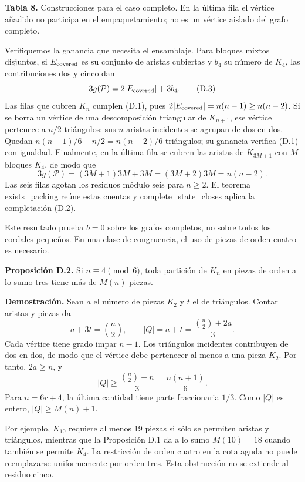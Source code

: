 \documentclass[spanish,11pt,a4paper]{article}
\begin{document}
\textbf{Tabla 8.} Construcciones para el caso completo. En la última fila el vértice añadido no participa en el empaquetamiento; no es un vértice aislado del grafo completo.

Verifiquemos la ganancia que necesita el ensamblaje. Para bloques mixtos disjuntos, si \(E_{\rm covered}\) es su conjunto de aristas cubiertas y \(b_4\) su número de \(K_4\), las contribuciones dos y cinco dan \[
3g(\mathcal P)=2|E_{\rm covered}|+3b_4.
\tag{D.3}
\] Las filas que cubren \(K_n\) cumplen (D.1), pues \(2|E_{\rm covered}|=n(n-1)\ge n(n-2)\). Si se borra un vértice de una descomposición triangular de \(K_{n+1}\), ese vértice pertenece a \(n/2\) triángulos: sus \(n\) aristas incidentes se agrupan de dos en dos. Quedan \(n(n+1)/6-n/2=n(n-2)/6\) triángulos; su ganancia verifica (D.1) con igualdad. Finalmente, en la última fila se cubren las aristas de \(K_{3M+1}\) con \(M\) bloques \(K_4\), de modo que \[
3g(\mathcal P)=(3M+1)3M+3M=(3M+2)3M=n(n-2).
\tag{D.4}
\] Las seis filas agotan los residuos módulo seis para \(n\ge2\). El teorema {\ttfamily\small exists\_\discretionary{\hbox{\ensuremath{\hookrightarrow}}}{}{}packing} reúne estas cuentas y {\ttfamily\small complete\_\discretionary{\hbox{\ensuremath{\hookrightarrow}}}{}{}state\_\discretionary{\hbox{\ensuremath{\hookrightarrow}}}{}{}closes} aplica la completación (D.2).

Este resultado prueba \(b=0\) sobre los grafos completos, no sobre todos los cordales pequeños. En una clase de congruencia, el uso de piezas de orden cuatro es necesario.

\textbf{Proposición D.2.} Si \(n\equiv4\pmod6\), toda partición de \(K_n\) en piezas de orden a lo sumo tres tiene más de \(M(n)\) piezas.

\textbf{Demostración.} Sean \(a\) el número de piezas \(K_2\) y \(t\) el de triángulos. Contar aristas y piezas da \[
a+3t=\binom n2,\qquad |Q|=a+t=\frac{\binom n2+2a}{3}.
\tag{D.5}
\] Cada vértice tiene grado impar \(n-1\). Los triángulos incidentes contribuyen de dos en dos, de modo que el vértice debe pertenecer al menos a una pieza \(K_2\). Por tanto, \(2a\ge n\), y \[
|Q|\ge\frac{\binom n2+n}{3}=\frac{n(n+1)}6.
\] Para \(n=6r+4\), la última cantidad tiene parte fraccionaria \(1/3\). Como \(|Q|\) es entero, \(|Q|\ge M(n)+1\).

Por ejemplo, \(K_{10}\) requiere al menos 19 piezas si sólo se permiten aristas y triángulos, mientras que la Proposición D.1 da a lo sumo \(M(10)=18\) cuando también se permite \(K_4\). La restricción de orden cuatro en la cota aguda no puede reemplazarse uniformemente por orden tres. Esta obstrucción no se extiende al residuo cinco.
\end{document}
